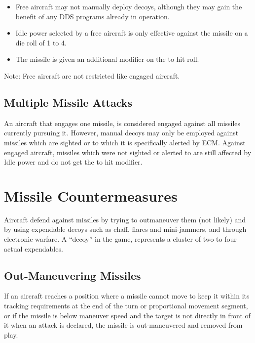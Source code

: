\begin{itemize}


    \item Free aircraft may not manually deploy decoys, although they may gain the benefit of any DDS programs already in operation.

    \item Idle power selected by a free aircraft is only effective against the missile on a die roll of 1 to 4.

    \item The missile is given an additional  modifier on the to hit roll.

\end{itemize}

Note: Free aircraft are not restricted like engaged aircraft.

\subsection{Multiple Missile Attacks} An aircraft that engages one missile, is considered engaged against all missiles currently pursuing it. However, manual decoys may only be employed against missiles which are sighted or to which it is specifically alerted by ECM. Against engaged aircraft, missiles which were not sighted or alerted to are still affected by Idle power and do not get the  to hit modifier.

\section{Missile Countermeasures}
\label{rule:missile-countermeasures}

Aircraft defend against missiles by trying to outmaneuver them (not likely) and by using expendable decoys such as chaff, flares and mini-jammers, and through electronic warfare. A “decoy” in the game, represents a cluster of two to four actual expendables.

\subsection{Out-Maneuvering Missiles} If an aircraft reaches a position where a missile cannot move to keep it within its tracking requirements at the end of the turn or proportional movement segment, or if the missile is below maneuver speed and the target is not directly in front of it when an attack is declared, the missile is out-maneuvered and removed from play.

